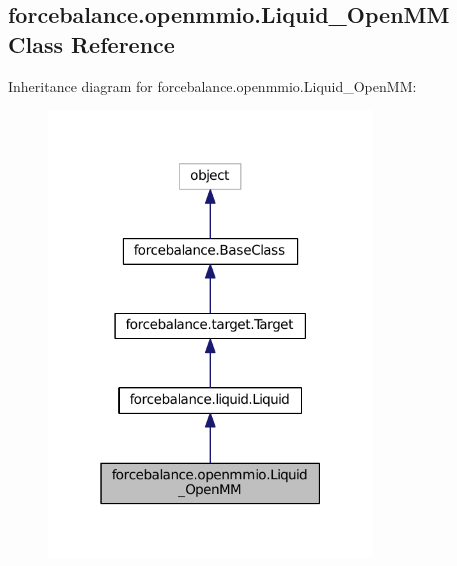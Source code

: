 \hypertarget{classforcebalance_1_1openmmio_1_1Liquid__OpenMM}{\subsection{forcebalance.\-openmmio.\-Liquid\-\_\-\-Open\-M\-M Class Reference}
\label{classforcebalance_1_1openmmio_1_1Liquid__OpenMM}
}


Inheritance diagram for forcebalance.\-openmmio.\-Liquid\-\_\-\-Open\-M\-M\-:
\nopagebreak
\begin{figure}[H]
\begin{center}
\leavevmode
\includegraphics[width=244pt]{classforcebalance_1_1openmmio_1_1Liquid__OpenMM__inherit__graph}
\end{center}
\end{figure}


